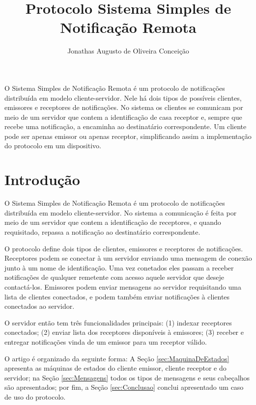 \documentclass[12pt]{article}
\title{Protocolo Sistema Simples de Notificação Remota}
\author{
	Jonathas Augusto de Oliveira Conceição\inst{1}
}
\begin{document}
\maketitle

\begin{resumo}
	O Sistema Simples de Notificação Remota é um protocolo de notificações distribuída em modelo cliente-servidor.
	Nele há dois tipos de possíveis clientes, emissores e receptores de notificações.
	No sistema os clientes se comunicam por meio de um servidor que contem a identificação de casa receptor e,
	sempre que recebe uma notificação,
	a encaminha ao destinatário correspondente.
	Um cliente pode ser apenas emissor ou apenas receptor, simplificando assim a implementação do protocolo em um dispositivo.
\end{resumo}

\section{Introdução}

O Sistema Simples de Notificação Remota
é um protocolo de notificações distribuída em modelo cliente-servidor.
No sistema a comunicação é feita por meio de um servidor que contem a identificação de receptores,
e quando requisitado, repassa a notificação ao destinatário correspondente.

O protocolo define dois tipos de clientes, emissores e receptores de notificações.
Receptores podem se conectar à um servidor enviando uma mensagem de conexão junto à um nome de identificação.
Uma vez conetados eles passam a receber notificações de qualquer remetente com acesso aquele servidor que deseje contactá-los.
Emissores podem enviar mensagens ao servidor requisitando uma lista de clientes conectados,
e podem também enviar notificações à clientes conectados ao servidor.

O servidor então tem três funcionalidades principais:
(1) indexar receptores conectados;
(2) enviar lista dos receptores disponíveis à emissores;
(3) receber e entregar notificações vinda de um emissor para um receptor válido.

O artigo é organizado da seguinte forma:
A Seção \ref{sec:MaquinaDeEstados} apresenta as máquinas de estados do cliente emissor, cliente receptor e do servidor;
na Seção \ref{sec:Mensagens} todos os tipos de mensagens e seus cabeçalhos são apresentados;
por fim, a Seção \ref{sec:Conclusao} conclui apresentado um caso de uso do protocolo.
\end{document}

